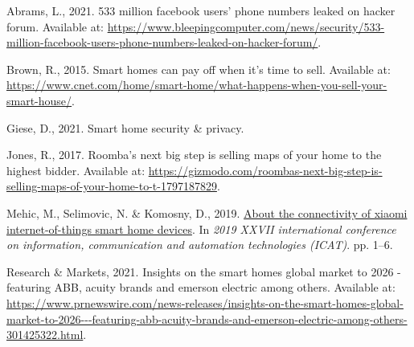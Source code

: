 \documentclass[]{resources/unswthesis}
\begin{document}
\hypertarget{refs}{}
\begin{CSLReferences}{1}{0}
\leavevmode{}%
Abrams, L., 2021. 533 million facebook users' phone numbers leaked on
hacker forum. Available at:
\url{https://www.bleepingcomputer.com/news/security/533-million-facebook-users-phone-numbers-leaked-on-hacker-forum/}.

\leavevmode{}%
Brown, R., 2015. Smart homes can pay off when it's time to sell.
Available at:
\url{https://www.cnet.com/home/smart-home/what-happens-when-you-sell-your-smart-house/}.

\leavevmode{}%
Giese, D., 2021. Smart home security \& privacy.

\leavevmode{}%
Jones, R., 2017. Roomba's next big step is selling maps of your home to
the highest bidder. Available at:
\url{https://gizmodo.com/roombas-next-big-step-is-selling-maps-of-your-home-to-t-1797187829}.

\leavevmode{}%
Mehic, M., Selimovic, N. \& Komosny, D., 2019.
\href{https://doi.org/10.1109/ICAT47117.2019.8939043}{About the
connectivity of xiaomi internet-of-things smart home devices}. In
\emph{2019 XXVII international conference on information, communication
and automation technologies (ICAT)}. pp. 1--6.

\leavevmode{}%
Research \& Markets, 2021. Insights on the smart homes global market to
2026 - featuring ABB, acuity brands and emerson electric among others.
Available at:
\url{https://www.prnewswire.com/news-releases/insights-on-the-smart-homes-global-market-to-2026---featuring-abb-acuity-brands-and-emerson-electric-among-others-301425322.html}.

\end{CSLReferences}

\backmatter





\end{document}
